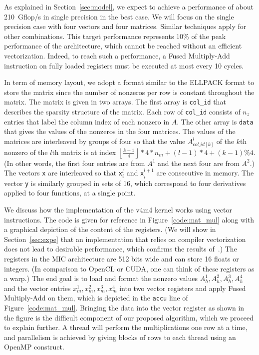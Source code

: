\documentclass{sig-alternate}
\def\ger#1{#1}
\newcommand{\floor}[1]{\left\lfloor#1\right\rfloor}
\begin{document}
As explained in Section~\ref{sec:model}, we expect to achieve a performance of
about 210~Gflop/s in single precision in the best case. We will focus
on the single precision case with four vectors and four matrices. 
Similar techniques apply for other combinations. This target
performance represents 10\% of the peak performance of the
architecture, which cannot be reached without an efficient vectorization. 
Indeed, to reach such a performance, a Fused Multiply-Add
instruction on fully loaded registers must be executed at most every
10 cycles.

In term of memory layout, we adopt a format similar to the ELLPACK
format to store the matrix since the number of nonzeros per row is
constant throughout the matrix. The matrix is given in two arrays. The
first array is {\tt col\_id} that describes the
sparsity structure of the matrix. Each row of {\tt col\_id} consists
of $n_z$ entries that label the column index of each nonzero in
$A$. %
The other array is  {\tt data} that gives the values of
the nonzeros in the four matrices. The values of the matrices are
interleaved by groups of four so that the value $A^l_{col\_id[k]}$ of
the $k$th nonzero of the $l$th matrix is at index $\floor{\frac{k-1}{4}}*4*n_m + (l-1)*4+(k-1)\%4$.
(In other words, the first four entries are from $A^{1}$ and the 
next four are from $A^2$.) The vectors {\tt x} are
interleaved so that {\tt x}$^l_i$ and {\tt x}$^{l+1}_i$ are
consecutive in memory. The vector {\tt y} is similarly 
grouped in sets of 16, which correspond to four derivatives applied to
four functions, at a single point. %


We discuss how the implementation of the v4m4 kernel works using
vector instructions. The code is given for reference in
Figure~\ref{code:mat_mul} along with a graphical depiction of the content of the registers. (We will show in Section~\ref{sec:expe}
that an implementation that relies on compiler vectorization does not lead
to desirable performance, which confirms the results
of~\cite{Saule13-ARXIV}.) The registers in the MIC architecture are
512 bits wide and can store 16 floats or integers. (In comparison to
OpenCL or CUDA, one can think of these registers as a warp.) The end
goal is to load and format the nonzero values $A_h^1,A_h^2,A_h^3,A_h^4$
and the vector entries $x_m^1,x_m^2,x_m^3,x_m^4$ into two vector registers and 
apply Fused Multiply-Add on them, which is depicted in the {\tt accu} line of 
Figure~\ref{code:mat_mul}. Bringing the data into the vector
register as shown in the figure is the difficult component of our 
proposed algorithm, which we proceed to explain further. 
A thread will perform the multiplications one row at a time,
and parallelism is achieved by giving blocks of rows to each thread
using an OpenMP construct.
\end{document}
